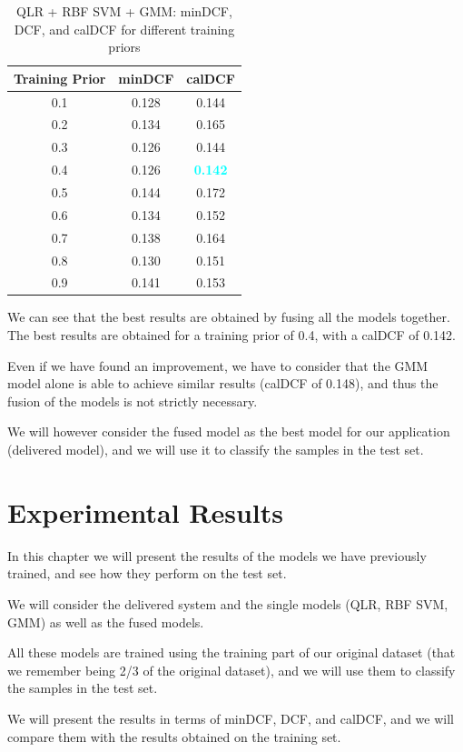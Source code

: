 \documentclass[12pt]{report}
\newcommand{\nnl}{%
    \newline
    \newline
}
\newcommand{\nl}{%
    \newline
    \noindent
}
\begin{document}
\begin{table}[H]
    \centering
    \begin{tabular}{|c|c|c|}
        \hline
        \rowcolor{blue!10}
        \textbf{Training Prior} & \textbf{minDCF} & \textbf{calDCF}                  \\
        \hline
        0.1                     & 0.128           & 0.144                            \\
        \hline
        0.2                     & 0.134           & 0.165                            \\
        \hline
        0.3                     & 0.126           & 0.144                            \\
        \hline
        0.4                     & 0.126           & \textcolor{cyan}{\textbf{0.142}} \\
        \hline
        0.5                     & 0.144           & 0.172                            \\
        \hline
        0.6                     & 0.134           & 0.152                            \\
        \hline
        0.7                     & 0.138           & 0.164                            \\
        \hline
        0.8                     & 0.130           & 0.151                            \\
        \hline
        0.9                     & 0.141           & 0.153                            \\
        \hline
    \end{tabular}
    \caption{QLR + RBF SVM + GMM: minDCF, DCF, and calDCF for different training priors}
    \label{tab:QLR_RBF_SVM_GMM_Priors}
\end{table}
\noindent
We can see that the best results are obtained by fusing all the models together. The best results are obtained for a training prior of 0.4, with a calDCF of 0.142.
\nl
Even if we have found an improvement, we have to consider that the GMM model alone is able to achieve similar results (calDCF of 0.148), and thus the fusion of the models is not strictly necessary.
\nnl
We will however consider the fused model as the best model for our application (delivered model), and we will use it to classify the samples in the test set.

\chapter{Experimental Results}
In this chapter we will present the results of the models we have previously trained, and see how they perform on the test set.
\nnl
We will consider the delivered system and the single models (QLR, RBF SVM, GMM) as well as the fused models.
\nl
All these models are trained using the training part of our original dataset (that we remember being 2/3 of the original dataset), and we will use them to classify the samples in the test set.
\nnl
We will present the results in terms of minDCF, DCF, and calDCF, and we will compare them with the results obtained on the training set.
\end{document}
